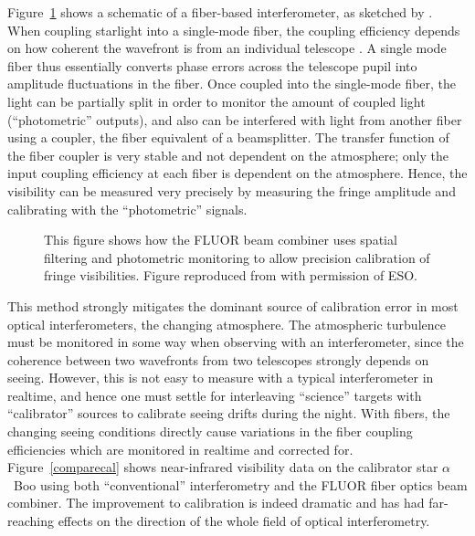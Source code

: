 \documentclass[12pt]{iopart}
\begin{document}
Figure~\ref{foresto97fig} shows a schematic of a fiber-based
interferometer, as sketched by \citet{foresto1997}.  When coupling
starlight into a single-mode fiber, the coupling efficiency depends on how
coherent the wavefront is from an individual telescope
\citep{shaklan1988}.  A single mode fiber thus essentially converts
phase errors across the telescope pupil into amplitude fluctuations in
the fiber.  Once coupled into the single-mode fiber, the light can be
partially split in order to monitor the amount of coupled light
(``photometric'' outputs), and also can be interfered with light from
another fiber using a coupler, the fiber equivalent of a
beamsplitter.  The transfer function of the fiber coupler is very
stable and not dependent on the atmosphere; only the input coupling
efficiency at each fiber is dependent on the atmosphere.  Hence, the
visibility can be measured very precisely \citep[$<$0.4\% uncertainty on V$^2$
reported by][]{perrin2003} by measuring the fringe amplitude and
calibrating with the ``photometric'' signals.

\begin{figure}
\begin{center}
\centerline{}
\caption{
This figure shows how the FLUOR beam combiner uses 
spatial filtering and photometric monitoring to allow
precision calibration of fringe visibilities.
Figure reproduced from \citet[][Figure1]{foresto1997} with permission of
ESO.
\label{foresto97fig}}
\end{center}
\end{figure}

This method strongly mitigates the dominant source of calibration
error in most optical interferometers, the changing atmosphere.  The
atmospheric turbulence must be monitored in some way when observing
with an interferometer, since the coherence between two wavefronts
from two telescopes strongly depends on seeing. However, this is not
easy to measure with a typical interferometer in realtime, and hence
one must settle for interleaving ``science'' targets with
``calibrator'' sources to calibrate seeing drifts during the night.
With fibers, the changing seeing conditions directly cause variations
in the fiber coupling efficiencies which are monitored in realtime and
corrected for.  Figure~\ref{comparecal} shows near-infrared visibility
data on the calibrator star $\alpha$~Boo using both ``conventional''
interferometry and the FLUOR fiber optics beam combiner.  The
improvement to calibration is indeed dramatic and has had
far-reaching effects on the direction of the whole field of optical
interferometry.
\end{document}
